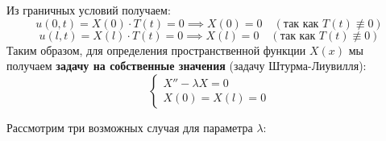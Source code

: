 Из граничных условий получаем:
\begin{equation}
	u(0,t) = X(0) \cdot T(t) = 0 \implies X(0) = 0 \quad (\text{так как } T(t) \not\equiv 0)
\end{equation}
\begin{equation}
	u(l,t) = X(l) \cdot T(t) = 0 \implies X(l) = 0 \quad (\text{так как } T(t) \not\equiv 0)
\end{equation}
Таким образом, для определения пространственной функции $X(x)$ мы получаем \textbf{задачу на собственные значения} (задачу Штурма-Лиувилля):
\begin{equation}
	\begin{cases}
		X'' - \lambda X = 0 \\
		X(0) = X(l) = 0
	\end{cases}
\end{equation}

Рассмотрим три возможных случая для параметра $\lambda$:

